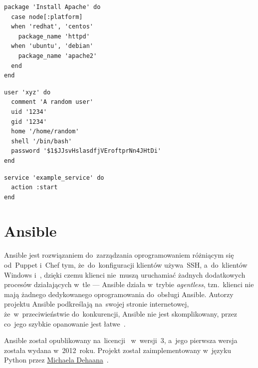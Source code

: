\documentclass[thesis]{subfiles}
\begin{document}
\begin{lstlisting}[numbers=none,caption={Przepis Chef gwarantujący, że~serwer Apache zostanie zainstalowany niezależnie od~tego jak~się~nazywa pakiet oprogramowania go~dostarczający},label=lst:chef-apache-example]
package 'Install Apache' do
  case node[:platform]
  when 'redhat', 'centos'
    package_name 'httpd'
  when 'ubuntu', 'debian'
    package_name 'apache2'
  end
end
\end{lstlisting}

\begin{lstlisting}[numbers=none,caption={Przepis Chef gwarantujący, że~użytkownik \texttt{xyz} istnieje w~systemie i~ma zadane ustawienia konta},label=lst:chef-user-example]
user 'xyz' do
  comment 'A random user'
  uid '1234'
  gid '1234'
  home '/home/random'
  shell '/bin/bash'
  password '$1$JJsvHslasdfjVEroftprNn4JHtDi'
end
\end{lstlisting}

\begin{lstlisting}[numbers=none,caption={Przepis Chef gwarantujący, że~serwis \texttt{example\_service} jest uruchomiony},label=lst:chef-service-example]
service 'example_service' do
  action :start
end
\end{lstlisting}


\section{Ansible}
\label{sec:ansible}

Ansible jest rozwiązaniem do~zarządzania oprogramowaniem różniącym się od~Puppet i~Chef tym, że~do~konfiguracji klientów  używa~SSH, a~do~klientów Windows  i~, dzięki czemu klienci nie~muszą uruchamiać żadnych dodatkowych procesów działających w~tle --- Ansible działa w~trybie \emph{agentless}, tzn.~klienci nie mają żadnego dedykowanego oprogramowania do~obsługi Ansible. Autorzy projektu Ansible podkreślają na~swojej stronie internetowej, że~w~przeciwieństwie do~konkurencji, Ansible nie jest skomplikowany, przez co~jego szybkie opanowanie jest łatwe~\cite{ansible}.

Ansible został opublikowany na~licencji~ w~wersji~3, a~jego pierwsza wersja została wydana w~2012~roku. Projekt został zaimplementowany w~języku Python przez \href{http://michaeldehaan.net/}{\mbox{Michaela} \mbox{Dehaana}}~\cite{ansible-github}.
\end{document}
